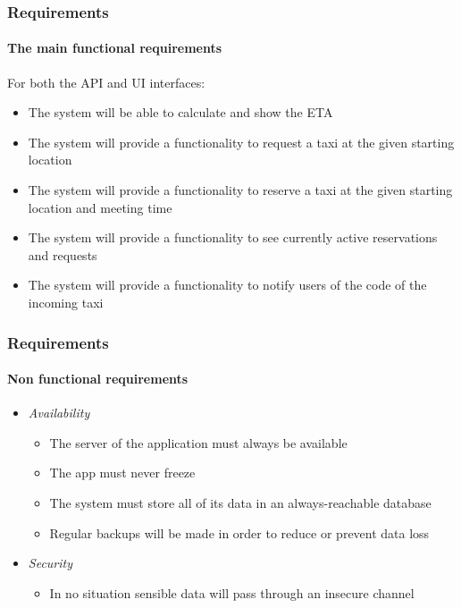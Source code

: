 \documentclass[10pt,xcolor={usenames,dvipsnames}]{beamer}
\begin{document}
\begin{frame}
	\frametitle{Requirements}
	\framesubtitle{The main functional requirements}
	For both the API and UI interfaces:
	\begin{itemize}
			\item The system will be able to calculate and show the ETA\@ 
			\item The system will provide a functionality to request a taxi at the given starting location 
			\item The system will provide a functionality to reserve a taxi at the given starting location and meeting time
			\item The system will provide a functionality to see currently active reservations and requests
			\item The system will provide a functionality to notify users of the code of the incoming taxi
	\end{itemize}
\end{frame}
\begin{frame}
	\frametitle{Requirements}
	\framesubtitle{Non functional requirements}
	\begin{itemize}
	\item \textit{Availability}
		\begin{itemize}
			\item The server of the application must always be available
			\item The app must never freeze 
			\item The system must store all of its data in an always-reachable database
			\item Regular backups will be made in order to reduce or prevent data loss
		\end{itemize}
	\item \textit{Security}
		\begin{itemize}
			\item In no situation sensible data will pass through an insecure channel
		\end{itemize}
\end{itemize}
\end{frame}
\end{document}
